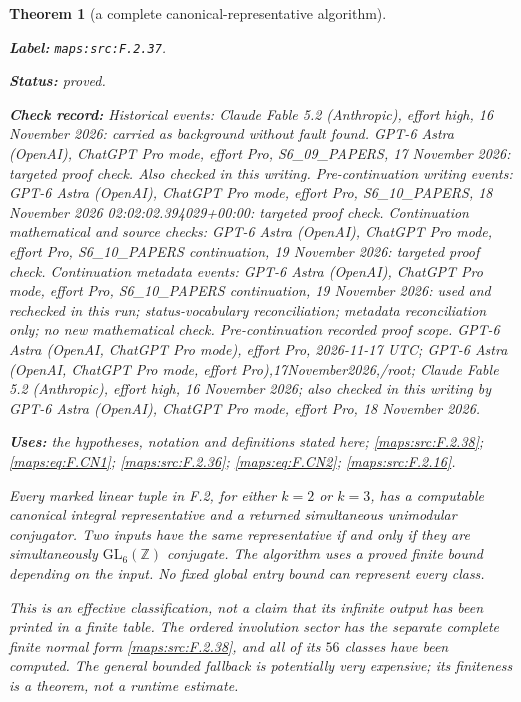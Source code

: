 \documentclass[11pt,a4paper]{article}
\newtheorem{theorem}{Theorem}[section]
\theoremstyle{definition}
\newcommand{\StatementRecord}[4]{\par\smallskip\begingroup\upshape\raggedright\noindent\textbf{Label:} \nolinkurl{#1}.\par\noindent\textbf{Status:} #2.\par\noindent\textbf{Check record:} #3.\par\noindent\textbf{Uses:} #4.\par\endgroup\smallskip}
\begin{document}
\begin{theorem}[a complete canonical-representative algorithm]\label{maps:src:F.2.37}
\StatementRecord{maps:src:F.2.37}{proved}{Historical events: Claude Fable 5.2 (Anthropic), effort high, 16 November 2026: carried as background without fault found. GPT-6 Astra (OpenAI), ChatGPT Pro mode, effort Pro, S6\_09\_PAPERS, 17 November 2026: targeted proof check. Also checked in this writing. Pre-continuation writing events: GPT-6 Astra (OpenAI), ChatGPT Pro mode, effort Pro, S6\_10\_PAPERS, 18 November 2026 02:02:02.394029+00:00: targeted proof check. Continuation mathematical and source checks: GPT-6 Astra (OpenAI), ChatGPT Pro mode, effort Pro, S6\_10\_PAPERS continuation, 19 November 2026: targeted proof check. Continuation metadata events: GPT-6 Astra (OpenAI), ChatGPT Pro mode, effort Pro, S6\_10\_PAPERS continuation, 19 November 2026: used and rechecked in this run; status-vocabulary reconciliation; metadata reconciliation only; no new mathematical check. \emph{Pre-continuation recorded proof scope.} GPT-6 Astra (OpenAI, ChatGPT Pro mode), effort Pro, 2026-11-17 UTC; GPT-6 Astra (OpenAI, ChatGPT Pro mode, effort Pro),17November2026,/root; Claude Fable 5.2 (Anthropic), effort high, 16 November 2026; also checked in this writing by GPT-6 Astra (OpenAI), ChatGPT Pro mode, effort Pro, 18 November 2026}{the hypotheses, notation and definitions stated here; \cref{maps:src:F.2.38}; \cref{maps:eq:F.CN1}; \cref{maps:src:F.2.36}; \cref{maps:eq:F.CN2}; \cref{maps:src:F.2.16}}


Every marked linear tuple in F.2, for either $k=2$ or $k=3$,
has a computable canonical integral representative and a
returned simultaneous unimodular conjugator. Two inputs have
the same representative if and only if they are simultaneously
$\mathrm{GL}_6(\mathbb Z)$ conjugate. The algorithm uses a proved
finite bound depending on the input. No fixed global entry bound
can represent every class.

This is an effective classification, not a claim that its
infinite output has been printed in a finite table. The
ordered involution sector has the separate complete finite
normal form \ref{maps:src:F.2.38}, and all of its $56$ classes have been
computed. The general bounded fallback is potentially very
expensive; its finiteness is a theorem, not a runtime estimate.

\end{theorem}
\end{document}
